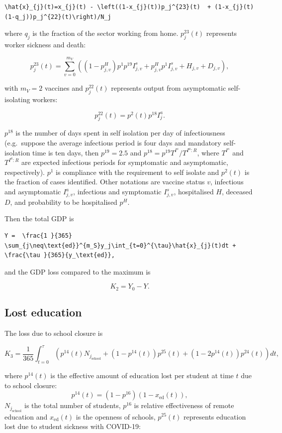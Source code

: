 \documentclass[
]{article}
\begin{document}
\begin{verbatim}
\hat{x}_{j}(t)=x_{j}(t) - \left((1-x_{j}(t))p_j^{23}(t)  + (1-x_{j}(t)(1-q_j))p_j^{22}(t)\right)/N_j
\end{verbatim}

where \(q_j\) is the fraction of the sector working from home. \(p_j^{23}(t)\) represents worker sickness and death:

\[p_j^{23}(t)=\sum_{v=0}^{m_V}\left(\left(1-p^H_{j,v}\right)p^1p^{19}I_{j,v}^{s}+p^H_{j,v}p^1I_{j,v}^{s}+H_{j,v}+D_{j,v}\right),\]

with \(m_V=2\) vaccines and \(p_j^{22}(t)\) represents output from asymptomatic self-isolating workers:

\[p_j^{22}(t)=p^2(t)p^{18}I_{j}^{a}.\]

\(p^{18}\) is the number of days spent in self isolation per day of infectiousness (e.g.~suppose the average infectious period is four days and mandatory self-isolation time is ten days, then \(p^{19}=2.5\) and \(p^{18}=p^{19}T^{I^s}/T^{I^a:R}\), where \(T^{I^s}\) and \(T^{I^a:R}\) are expected infectious periods for symptomatic and asymptomatic, respectively). \(p^1\) is compliance with the requirement to self isolate and \(p^2(t)\) is the fraction of cases identified. Other notations are vaccine status \(v\), infectious and asymptomatic \(I_{j,v}^{a}\), infectious and symptomatic \(I_{j,v}^{s}\), hospitalised \(H\), deceased \(D\), and probability to be hospitalised \(p^H\).

Then the total GDP is

\begin{verbatim}
Y =  \frac{1 }{365} \sum_{j\neq\text{ed}}^{m_S}y_j\int_{t=0}^{\tau}\hat{x}_{j}(t)dt + \frac{\tau }{365}{y_\text{ed}},
\end{verbatim}

and the GDP loss compared to the maximum is

\[K_2=Y_0-Y.\]

\hypertarget{lost-education}{%
\subsection{Lost education}\label{lost-education}}

The loss due to school closure is

\[K_3 =  \frac{1 }{365} \int_{t=0}^{\tau}\left(p^{14}(t)N_{j_{\text{school}}} + (1-p^{14}(t))p^{25}(t)  +(1-2p^{14}(t))p^{24}(t)\right)dt,\]

where \(p^{14}(t)\) is the effective amount of education lost per student at time \(t\) due to school closure:
\[p^{14}(t) = (1-p^{16})(1-x_{\text{ed}}(t)),\]
\(N_{j_{\text{school}}}\) is the total number of students, \(p^{16}\) is relative effectiveness of remote education and \(x_{\text{ed}}(t)\) is the openness of schools, \(p^{25}(t)\) represents education lost due to student sickness with COVID-19:
\end{document}
